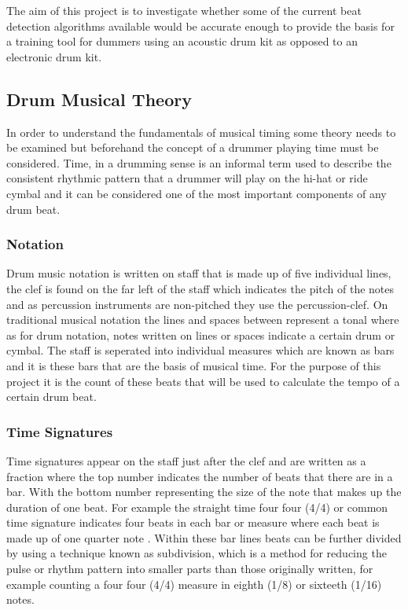 \documentclass[a4paper, 11pt]{article}
\begin{document}
The aim of this project is to investigate whether some of the current beat detection algorithms available would be accurate enough to provide the basis for a training tool for dummers using an acoustic drum kit as opposed to an electronic drum kit. \par

\subsection{Drum Musical Theory}
In order to understand the fundamentals of musical timing some theory needs to be examined but beforehand the concept of a drummer playing time must be considered. Time, in a drumming sense is an informal term used to describe the consistent rhythmic pattern that a drummer will play on the hi-hat or ride cymbal \cite{drum-bible} and it can be considered one of the most important components of any drum beat. 

\subsubsection{Notation}
Drum music notation is written on staff that is made up of five individual lines, the clef is found on the far left of the staff which indicates the pitch of the notes \cite{oxford-comp} and as percussion instruments are non-pitched they use the percussion-clef. On traditional musical notation the lines and spaces between represent a tonal where as for drum notation, notes written on lines or spaces indicate a certain drum or cymbal. The staff is seperated into individual measures which are known as bars \cite{drum-note} and it is these bars that are the basis of musical time. For the purpose of this project it is the count of these beats that will be used to calculate the tempo of a certain drum beat.

\subsubsection{Time Signatures}
Time signatures appear on the staff just after the clef and are written as a fraction where the top number indicates the number of beats that there are in a bar. With the bottom number representing the size of the note that makes up the duration of one beat. For example the straight time four four (4/4) or common time signature indicates four beats in each bar or measure where each beat is made up of one quarter note \cite{drum-note}. Within these bar lines beats can be further divided by using a technique known as subdivision, which is a method for reducing the pulse or rhythm pattern into smaller parts than those originally written, for example counting a four four (4/4) measure in eighth (1/8) or sixteeth (1/16) notes. 
\end{document}
